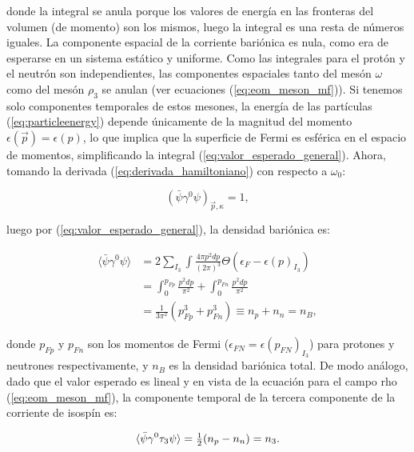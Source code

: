 donde la integral se anula porque los valores de energía en las fronteras del volumen (de momento) son los mismos, luego la integral es una resta de números iguales. La componente espacial de la corriente bariónica es nula, como era de esperarse en un sistema estático y uniforme. Como las integrales para el protón y el neutrón son independientes, las componentes espaciales tanto del mesón $\omega$ como del mesón $\rho_3$ se anulan (ver ecuaciones (\ref{eq:eom_meson_mf})). Si tenemos solo componentes temporales de estos mesones, la energía de las partículas (\ref{eq:particleenergy}) depende únicamente de la magnitud del momento $\epsilon(\Vec{p}) = \epsilon(p)$, lo que implica que la superficie de Fermi es esférica en el espacio de momentos, simplificando la integral (\ref{eq:valor_esperado_general}). Ahora, tomando la derivada (\ref{eq:derivada_hamiltoniano}) con respecto a $\omega_0$:

\begin{equation*}
	(\bar{\psi} \gamma^0 \psi)_{\Vec{p},\kappa} = 1,
\end{equation*}

luego por (\ref{eq:valor_esperado_general}), la densidad bariónica es:

\begin{equation}
	\begin{aligned}
		\langle \bar{\psi} \gamma^0 \psi \rangle &= 2\sum_{I_3}\int \frac{4 \pi p^2 dp}{(2\pi)^3} \Theta(\epsilon_F - \epsilon(p)_{I_3}) \\
												 &= \int_0^{p_{Fp}} \frac{p^2 dp}{\pi^2} + \int_0^{p_{Fn}} \frac{p^2 dp}{\pi^2} \\
												 &= \frac{1}{3\pi^2}(p_{Fp}^3 + p_{Fn}^3) \equiv n_p + n_n = n_B,
		\label{eq:densidad_barionica}
	\end{aligned}
\end{equation}

donde $p_{Fp}$ y $p_{Fn}$ son los momentos de Fermi ($\epsilon_{FN} = \epsilon(p_{FN})_{I_3}$) para protones y neutrones respectivamente, y $n_B$ es la densidad bariónica total. De modo análogo, dado que el valor esperado es lineal y en vista de la ecuación para el campo rho (\ref{eq:eom_meson_mf}), la componente temporal de la tercera componente de la corriente de isospín es:

\begin{equation}
		\langle \bar{\psi} \gamma^0 \tau_3 \psi \rangle = \tfrac{1}{2} (n_p - n_n) = n_3.
		\label{eq:densidad_isospin}
\end{equation}

